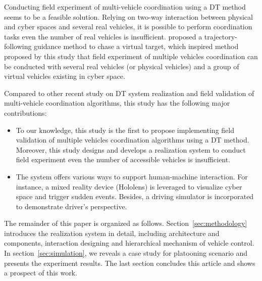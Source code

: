 \documentclass[conference]{IEEEtran}
\begin{document}
	Conducting field experiment of multi-vehicle coordination using a DT method seems to be a feasible solution. Relying on two-way interaction between physical and cyber spaces and several real vehicles, it is possible to perform coordination tasks even the number of real vehicles is insufficient. \cite{ref:intro3} proposed a trajectory-following guidance method to chase a virtual target, which inspired method proposed by this study that field experiment of multiple vehicles coordination can be conducted with several real vehicles (or physical vehicles) and a group of virtual vehicles existing in cyber space.
	
	Compared to other recent study on DT system realization and field validation of multi-vehicle coordination algorithms, this study has the following major contributions:
	\begin{itemize}
		\item To our knowledge, this study is the first to propose implementing field validation of multiple vehicles coordination algorithms using a DT method. Moreover, this study designs and develops a realization system to conduct field experiment even the number of accessible vehicles is insufficient.   
		\item The system offers various ways to support human-machine interaction. For instance, a mixed reality device (Hololens) is leveraged to visualize cyber space and trigger sudden events. Besides, a driving simulator is incorporated to demonstrate driver's perspective.
	\end{itemize}
	
	The remainder of this paper is organized as follows. Section~\ref{sec:methodology} introduces the realization system in detail, including architecture and components, interaction designing and hierarchical mechanism of vehicle control. In section~\ref{sec:simulation}, we reveals a case study for platooning scenario and presents the experiment results. The last section concludes this article and shows a prospect of this work. 
	
\end{document}
